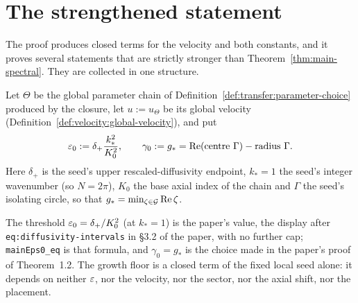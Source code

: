\section{The strengthened statement}

The proof produces closed terms for the velocity and both constants, and it
proves several statements that are strictly stronger than
Theorem~\ref{thm:main-spectral}.  They are collected in one structure.

\begin{definition}
  \label{def:main:witnesses}
  \leanok
  Let $\Theta$ be the global parameter chain of
  Definition~\ref{def:transfer:parameter-choice} produced by the closure, let
  $u:=u_\Theta$ be its global velocity
  (Definition~\ref{def:velocity:global-velocity}), and put
  \[
    \varepsilon_0:=\delta_+\frac{k_*^2}{K_0^2},
    \qquad
    \gamma_0:=g_*=\operatorname{Re}(\text{centre }\Gamma)-\text{radius }\Gamma .
  \]
  Here $\delta_+$ is the seed's upper rescaled-diffusivity endpoint, $k_*=1$ the seed's
  integer wavenumber (so $N=2\pi$), $K_0$ the base axial index of the chain and $\Gamma$ the
  seed's isolating circle, so that $g_*=\min_{\zeta\in\mathcal{G}}\operatorname{Re}\zeta$.
\end{definition}

The threshold $\varepsilon_0=\delta_+/K_0^2$ (at $k_*=1$) is the paper's value, the display
after \texttt{eq:diffusivity-intervals} in §3.2 of the paper, with no further cap;
\texttt{mainEps0\_eq} is that formula, and $\gamma_0=g_*$ is the choice made in the paper's
proof of Theorem~1.2.  The growth floor is a closed term of the fixed local seed alone: it
depends on neither $\varepsilon$, nor the velocity, nor the sector, nor the axial shift, nor the
placement.

